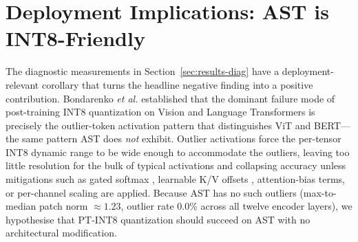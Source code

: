\documentclass[conference]{IEEEtran}
\begin{document}
\section{Deployment Implications: AST is INT8-Friendly}
\label{sec:int8}

The diagnostic measurements in Section~\ref{sec:results-diag} have a deployment-relevant corollary that turns the headline negative finding into a positive contribution. Bondarenko \emph{et al.} \cite{bondarenko2023quantizable} established that the dominant failure mode of post-training INT8 quantization on Vision and Language Transformers is precisely the outlier-token activation pattern that distinguishes ViT and BERT---the same pattern AST does \emph{not} exhibit. Outlier activations force the per-tensor INT8 dynamic range to be wide enough to accommodate the outliers, leaving too little resolution for the bulk of typical activations and collapsing accuracy unless mitigations such as gated softmax \cite{bondarenko2023quantizable}, learnable K/V offsets \cite{sun2024massive}, attention-bias terms, or per-channel scaling are applied. Because AST has no such outliers (max-to-median patch norm $\approx 1.23$, outlier rate $0.0\%$ across all twelve encoder layers), we hypothesise that PT-INT8 quantization should succeed on AST with no architectural modification.
\end{document}

